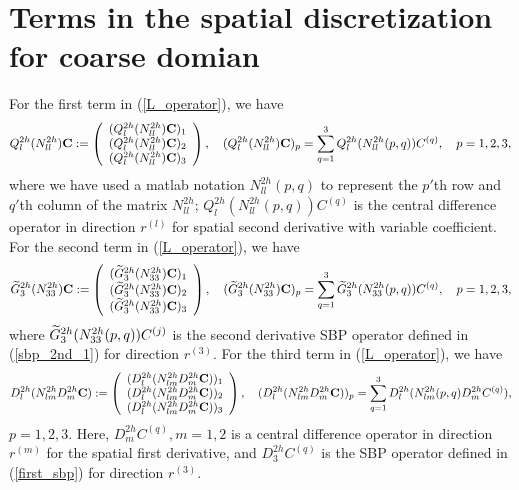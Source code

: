 \section{Terms in the spatial discretization for coarse domian}\label{appendix_cdomain}
For the first term in (\ref{L_operator}), we have
\begin{align*}
{Q}_l^{2h}({N}_{ll}^{2h}){\bf C} := \left(\begin{array}{c}
({Q}_l^{2h}({N}_{ll}^{2h}){\bf C})_1 \\
({Q}_l^{2h}({N}_{ll}^{2h}){\bf C})_2 \\
({Q}_l^{2h}({N}_{ll}^{2h}){\bf C})_3 
\end{array}\right), \quad ({Q}_l^{2h}({N}_{ll}^{2h}){\bf C})_p = \sum_{q = 1}^{3} Q_l^{2h}(N_{ll}^{2h}(p,q)) {C}^{(q)},\quad p = 1,2,3,
\end{align*}
where we have used a matlab notation $N_{ll}^{2h}(p,q)$ to represent the $p'$th row and $q'$th column of the matrix $N_{ll}^{2h}$; $Q_l^{2h}(N_{ll}^{2h}(p,q)){ C}^{(q)}$ is the central difference operator in direction $r^{(l)}$ for spatial second derivative with variable coefficient. For the second term in (\ref{L_operator}), we have
\begin{align*}
\widetilde{{G}}_3^{2h}({N}_{33}^{2h}){\bf C} := \left(\begin{array}{c}
(\widetilde{{G}}_3^{2h}({N}_{33}^{2h}){\bf C})_1 \\
(\widetilde{{G}}_3^{2h}({N}_{33}^{2h}){\bf C})_2 \\
(\widetilde{{G}}_3^{2h}({N}_{33}^{2h}){\bf C})_3 
\end{array}\right), \quad (\widetilde{{G}}_3^{2h}({N}_{33}^{2h}){\bf C})_p = \sum_{q = 1}^{3} \widetilde{G}_3^{2h}(N_{33}^{2h}(p,q)) {C}^{(q)},\quad p = 1,2,3,
\end{align*}
where $\widetilde{G}_3^{2h}(N_{33}^{2h}(p,q)) { C}^{(j)}$ is the second derivative SBP operator  defined in (\ref{sbp_2nd_1}) for direction $r^{(3)}$. For the third term in (\ref{L_operator}), we have
\begin{align*}
{D}_l^{2h}({N}_{lm}^{2h}{D}_m^{2h}{\bf C}) := \left(\begin{array}{c}
(D^{2h}_l(N^{2h}_{lm}D_m^{2h}{\bf C}))_1 \\
(D^{2h}_l(N^{2h}_{lm}D_m^{2h}{\bf C}))_2 \\
(D^{2h}_l(N^{2h}_{lm}D_m^{2h}{\bf C}))_3 
\end{array}\right), \quad (D^{2h}_l(N^{2h}_{lm}D_m^{2h}{\bf C}))_p = \sum_{q = 1}^{3} D^{2h}_l(N^{2h}_{lm}(p,q)D_m^{2h}{C}^{(q)}),
\end{align*}
$p = 1,2,3$. Here, $D_m^{2h}C^{(q)}, m = 1,2$ is a central difference operator in direction $r^{(m)}$ for the spatial first derivative, and $D_3^{2h}C^{(q)}$ is the SBP operator defined in (\ref{first_sbp}) for direction $r^{(3)}$.

